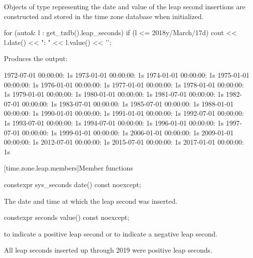 \pnum
Objects of type  representing
the date and value of the leap second insertions
are constructed and stored in the time zone database when initialized.

\pnum
\begin{example}
\begin{codeblock}
for (auto& l : get_tzdb().leap_seconds)
  if (l <= 2018y/March/17d)
    cout << l.date() << ": " << l.value() << '\n';
\end{codeblock}

Produces the output:
\begin{outputblock}
1972-07-01 00:00:00: 1s
1973-01-01 00:00:00: 1s
1974-01-01 00:00:00: 1s
1975-01-01 00:00:00: 1s
1976-01-01 00:00:00: 1s
1977-01-01 00:00:00: 1s
1978-01-01 00:00:00: 1s
1979-01-01 00:00:00: 1s
1980-01-01 00:00:00: 1s
1981-07-01 00:00:00: 1s
1982-07-01 00:00:00: 1s
1983-07-01 00:00:00: 1s
1985-07-01 00:00:00: 1s
1988-01-01 00:00:00: 1s
1990-01-01 00:00:00: 1s
1991-01-01 00:00:00: 1s
1992-07-01 00:00:00: 1s
1993-07-01 00:00:00: 1s
1994-07-01 00:00:00: 1s
1996-01-01 00:00:00: 1s
1997-07-01 00:00:00: 1s
1999-01-01 00:00:00: 1s
2006-01-01 00:00:00: 1s
2009-01-01 00:00:00: 1s
2012-07-01 00:00:00: 1s
2015-07-01 00:00:00: 1s
2017-01-01 00:00:00: 1s
\end{outputblock}
\end{example}

[time.zone.leap.members]{Member functions}

%
\begin{itemdecl}
constexpr sys_seconds date() const noexcept;
\end{itemdecl}

\begin{itemdescr}
\pnum
\returns
The date and time at which the leap second was inserted.
\end{itemdescr}

%
\begin{itemdecl}
constexpr seconds value() const noexcept;
\end{itemdecl}

\begin{itemdescr}
\pnum
\returns
{} to indicate a positive leap second or
 to indicate a negative leap second.
\begin{note}
All leap seconds inserted up through 2019 were positive leap seconds.
\end{note}
\end{itemdescr}

